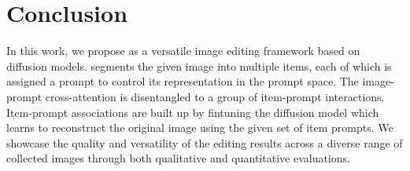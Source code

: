 \section{Conclusion}
In this work, we propose \dedit{} as a versatile image editing framework based on diffusion models.
\dedit{} segments the given image into multiple items, each of which is assigned a prompt to control its representation in the prompt space.
The image-prompt cross-attention is disentangled to a group of item-prompt interactions.
Item-prompt associations are built up by fintuning the diffusion model which learns to reconstruct the original image using the given set of item prompts.
We showcase the quality and versatility of the editing results across a diverse range of collected images through both qualitative and quantitative evaluations.
